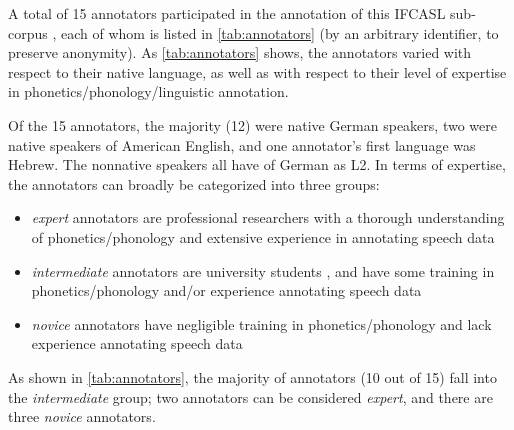 	A total of 15 annotators participated in the annotation of this IFCASL sub-corpus , each of whom is listed in \cref{tab:annotators} (by an arbitrary identifier, to preserve anonymity).
	As \cref{tab:annotators} shows, the annotators varied with respect to their native language, as well as with respect to their level of expertise in phonetics/phonology/linguistic annotation. 
	 
	Of the 15 annotators, the majority (12) were native German speakers, two were native speakers of American English, and one annotator's first language was Hebrew. The nonnative speakers all have   of German as L2.
	In terms of expertise, the annotators can broadly be categorized into three groups: 
	\begin{itemize}
	\item{\textit{expert} annotators are professional researchers with a thorough understanding of phonetics/phonology and extensive experience in annotating speech data}
	\item{\textit{intermediate} annotators are university students , and have some training in phonetics/phonology and/or experience annotating speech data}
	\item{\textit{novice} annotators have negligible training in phonetics/phonology and lack experience annotating speech data}
	\end{itemize}
	As shown in \cref{tab:annotators}, the majority of annotators (10 out of 15) fall into the \textit{intermediate} group; two annotators can be considered \textit{expert}, and there are three \textit{novice} annotators.
	
